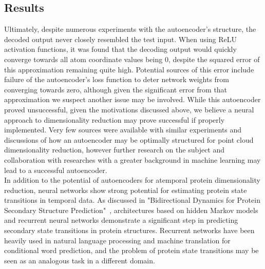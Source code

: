 \documentclass{article}
\begin{document}
\subsection{Results}
Ultimately, despite numerous experiments with the autoencoder's structure, the decoded output never closely resembled the test input. When using ReLU activation functions, it was found that the decoding output would quickly converge towards all atom coordinate values being 0, despite the squared error of this approximation remaining quite high. Potential sources of this error include failure of the autoencoder's loss function to deter network weights from converging towards zero, although given the significant error from that approximation we suspect another issue may be involved. While this autoencoder proved unsuccessful, given the motivations discussed above, we believe a neural approach to dimensionality reduction may prove successful if properly implemented. Very few sources were available with similar experiments and discussions of how an autoencoder may be optimally structured for point cloud dimensionality reduction, however further research on the subject and collaboration with researches with a greater background in machine learning may lead to a successful autoencoder. \\

In addition to the potential of autoencoders for atemporal protein dimensionality reduction, neural networks show strong potential for estimating protein state transitions in temporal data. As discussed in "Bidirectional Dynamics for Protein Secondary Structure Prediction"~\cite{recurrentnetworks}, architectures based on hidden Markov models and recurrent neural networks demonstrate a significant step in predicting secondary state transitions in protein structures. Recurrent networks have been heavily used in natural language processing and machine translation for conditional word prediction, and the problem of protein state transitions may be seen as an analogous task in a different domain.
\end{document}
